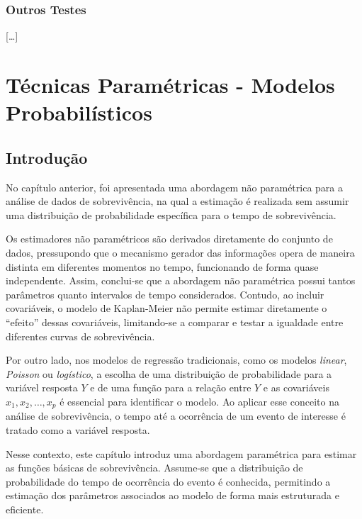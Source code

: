 \documentclass[
  12pt,
  letterpaper,
  DIV=11,
  numbers=noendperiod]{scrreprt}
\begin{document}
\subsection{Outros Testes}\label{outros-testes}

{[}\ldots{]}


\chapter{Técnicas Paramétricas - Modelos
Probabilísticos}\label{tuxe9cnicas-paramuxe9tricas---modelos-probabiluxedsticos}

\section{Introdução}\label{introduuxe7uxe3o-2}

No capítulo anterior, foi apresentada uma abordagem não paramétrica para
a análise de dados de sobrevivência, na qual a estimação é realizada sem
assumir uma distribuição de probabilidade específica para o tempo de
sobrevivência.

Os estimadores não paramétricos são derivados diretamente do conjunto de
dados, pressupondo que o mecanismo gerador das informações opera de
maneira distinta em diferentes momentos no tempo, funcionando de forma
quase independente. Assim, conclui-se que a abordagem não paramétrica
possui tantos parâmetros quanto intervalos de tempo considerados.
Contudo, ao incluir covariáveis, o modelo de Kaplan-Meier não permite
estimar diretamente o ``efeito'' dessas covariáveis, limitando-se a
comparar e testar a igualdade entre diferentes curvas de sobrevivência.

Por outro lado, nos modelos de regressão tradicionais, como os modelos
\emph{linear}, \emph{Poisson} ou \emph{logístico}, a escolha de uma
distribuição de probabilidade para a variável resposta \(Y\) e de uma
função para a relação entre \(Y\) e as covariáveis
\(x_{1}, x_{2}, \ldots, x_{p}\) é essencial para identificar o modelo.
Ao aplicar esse conceito na análise de sobrevivência, o tempo até a
ocorrência de um evento de interesse é tratado como a variável resposta.

Nesse contexto, este capítulo introduz uma abordagem paramétrica para
estimar as funções básicas de sobrevivência. Assume-se que a
distribuição de probabilidade do tempo de ocorrência do evento é
conhecida, permitindo a estimação dos parâmetros associados ao modelo de
forma mais estruturada e eficiente.
\end{document}
